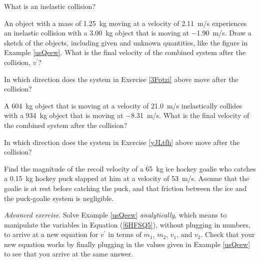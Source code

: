 \documentclass[main.tex]{subfiles}
\begin{document}

\begin{exercise} \label{Hjk6xk}
    What is an inelastic collision?
\end{exercise}

\begin{exercise} \label{3Fptzi}
    An object with a mass of \SI{1.25}{kg} moving at a velocity of \SI{2.11}{m/s} experiences an inelastic collision with a \SI{3.00}{kg} object that is moving at \SI{-1.90}{m/s}. Draw a sketch of the objects, including given and unknown quantities, like the figure in Example \ref{usQeew}. What is the final velocity of the combined system after the collision, $v^{\prime}$? 
\end{exercise}

\begin{exercise} \label{17GLnY}
    In which direction does the system in Exercise \ref{3Fptzi} above move after the collision?
\end{exercise}

\begin{exercise} \label{yJLtfh}
        A \SI{604}{kg} object that is moving at a velocity of \SI{21.0}{m/s} inelastically collides with a \SI{934}{kg} object that is moving at \SI{-8.31}{m/s}. What is the final velocity of the combined system after the collision?
\end{exercise}

\begin{exercise} \label{ViY0SX}
    In which direction does the system in Exercise \ref{yJLtfh} above move after the collision?
\end{exercise}



\begin{exercise} \label{jA5zHj}
Find the magnitude of the recoil velocity of a \SI{65}{kg} ice hockey goalie who catches a \SI{0.15}{kg} hockey puck slapped at him at a velocity of \SI{53}{m/s}. Assume that the goalie is at rest before catching the puck, and that friction between the ice and the puck-goalie system is negligible.
\end{exercise}

\begin{exercise} \label{}
\textit{Advanced exercise}. Solve Example \ref{usQeew} \textit{analytically}, which means to manipulate the variables in Equation (\ref{6HFSQ5}), without plugging in numbers, to arrive at a new equation for $v^{\prime}$ in terms of $m_1$, $m_2$, $v_1$, and $v_2$. Check that your new equation works by finally plugging in the values given in Example \ref{usQeew} to see that you arrive at the same answer.
\end{exercise}
\end{document}
